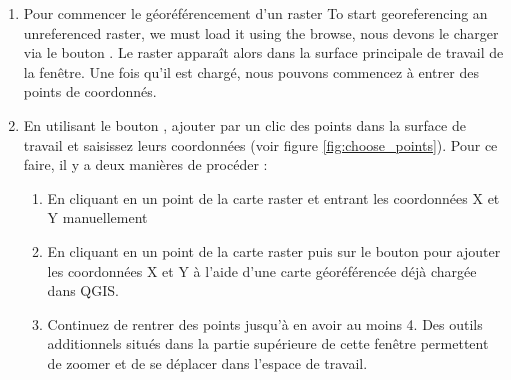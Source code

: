 \label{georeferencer_entering}

\begin{enumerate}
\item Pour commencer le géoréférencement d'un raster To start georeferencing an unreferenced raster, we must load it using the \browsebutton browse, nous devons le charger via le bouton \browsebutton. Le raster apparaît alors dans la surface principale de travail de la fenêtre. Une fois qu'il est chargé, nous pouvons commencez à entrer des points de coordonnés.

\item En utilisant le bouton , ajouter par un clic des points dans la surface de travail et saisissez leurs coordonnées (voir figure \ref{fig:choose_points}). Pour ce faire, il y a deux manières de procéder :


\begin{enumerate}
\item En cliquant en un point de la carte raster et entrant les coordonnées X et Y manuellement
\item En cliquant en un point de la carte raster puis sur le bouton  pour ajouter les coordonnées X et Y à l'aide d'une carte géoréférencée déjà chargée dans QGIS.
\item Continuez de rentrer des points jusqu'à en avoir au moins 4. Des outils additionnels situés dans la partie supérieure de cette fenêtre permettent de zoomer et de se déplacer dans l'espace de travail.


\end{enumerate}
\end{enumerate}
